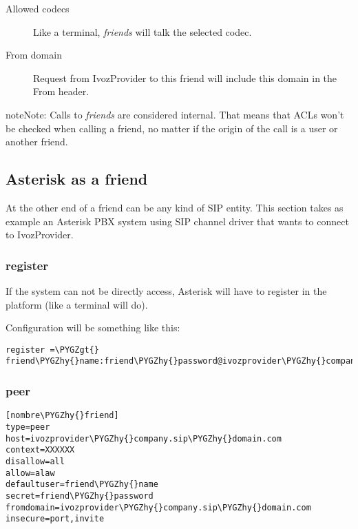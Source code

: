 \documentclass[letterpaper,10pt,english]{sphinxmanual}
\def\PYGZgt{\char`\>}
\def\PYGZhy{\char`\-}
\begin{document}
\begin{description}
\item[{Allowed codecs}] \leavevmode{}\label{company/friends:term-allowed-codecs}
Like a terminal, \emph{friends} will talk the selected codec.

\item[{From domain}] \leavevmode{}\label{company/friends:term-from-domain}
Request from IvozProvider to this friend will include this domain in
the From header.

\end{description}

\begin{notice}{note}{Note:}
Calls to \emph{friends} are considered internal. That means that ACLs won't
be checked when calling a friend, no matter if the origin of the call
is a user or another friend.
\end{notice}


\subsection{Asterisk as a friend}
\label{company/friends:asterisk-as-a-friend}
At the other end of a friend can be any kind of SIP entity. This section takes
as example an Asterisk PBX system using SIP channel driver that wants to connect
to IvozProvider.


\subsubsection{register}
\label{company/friends:register}
If the system can not be directly access, Asterisk will have to register in the
platform (like a terminal will do).

Configuration will be something like this:

\begin{Verbatim}[commandchars=\\\{\}]
register =\PYGZgt{} friend\PYGZhy{}name:friend\PYGZhy{}password@ivozprovider\PYGZhy{}company.sip\PYGZhy{}domain.com
\end{Verbatim}


\subsubsection{peer}
\label{company/friends:peer}
\begin{Verbatim}[commandchars=\\\{\}]
[nombre\PYGZhy{}friend]
type=peer
host=ivozprovider\PYGZhy{}company.sip\PYGZhy{}domain.com
context=XXXXXX
disallow=all
allow=alaw
defaultuser=friend\PYGZhy{}name
secret=friend\PYGZhy{}password
fromdomain=ivozprovider\PYGZhy{}company.sip\PYGZhy{}domain.com
insecure=port,invite
\end{Verbatim}
\end{document}
